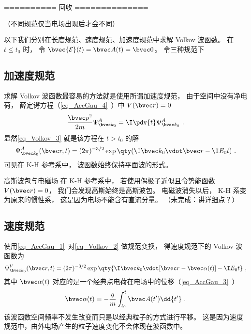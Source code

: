 ========== 回收 ==============


（不同规范仅当电场出现后才会不同）

以下我们分别在长度规范、速度规范、加速度规范中求解 Volkov 波函数。 在 $t \le t_0$ 时， 令 $\bvec {\mathcal E}(t) = \bvec A(t) = \bvec 0$。 令三种规范下 




\subsection{加速度规范}
求解 Volkov 波函数最容易的方法就是使用所谓加速度规范， 由于空间中没有净电荷， 薛定谔方程（\autoref{eq_AccGau_4}~）中 $V(\bvec r) = 0$
\begin{equation}
\frac{\bvec p^2}{2m}\Psi_{\bvec k_0}^A = \I \pdv{t} \Psi_{\bvec k_0}^A~.
\end{equation}
显然\autoref{eq_Volkov_3} 就是该方程在 $t > t_0$ 的解
\begin{equation}\label{eq_Volkov_2}
\Psi_{\bvec k_0}^A(\bvec r, t) = (2\pi)^{-3/2} \exp\qty(\I\bvec k_0 \vdot \bvec r - \I E_0 t)~.
\end{equation}
可见在 K-H 参考系中， 波函数始终保持平面波的形式。

\begin{example}{高斯波包与电磁场}
在 K-H 参考系中， 若使用偶极子近似且令势能函数 $V(\bvec r) = 0$， 我们会发现高斯始终是高斯波包。 电磁波消失以后， K-H 系变为原来的惯性系， 这是因为电场不能含有直流分量。 （未完成：讲详细点？）
\end{example}

\subsection{速度规范}
使用\autoref{eq_AccGau_1}~对\autoref{eq_Volkov_2} 做规范变换， 得速度规范下的 Volkov 波函数为
\begin{equation}\label{eq_Volkov_1}
\Psi_{\bvec k_0}^V(\bvec r, t) = (2\pi)^{-3/2} \exp\qty{\I \bvec k_0 \vdot [\bvec r - \bvec \alpha(t)] - \I E_0 t}~,
\end{equation}
其中 $\bvec \alpha(t)$ 对应的是一个经典点电荷在电场中的位移（\autoref{eq_AccGau_3}~）
\begin{equation}
\bvec \alpha(t) = -\frac{q}{m} \int_{t_0}^t \bvec A(t') \dd{t'}~.
\end{equation}
该波函数空间频率不发生改变而只是以经典粒子的方式进行平移。 这是因为速度规范中，由外电场产生的粒子速度变化不会体现在波函数中。

